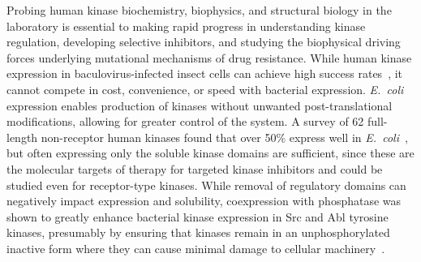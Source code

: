 \documentclass[phd,tocprelim]{cornell}
\begin{document}
Probing human kinase biochemistry, biophysics, and structural biology in the laboratory is essential to making rapid progress in understanding kinase regulation, developing selective inhibitors, and studying the biophysical driving forces underlying mutational mechanisms of drug resistance.
While human kinase expression in baculovirus-infected insect cells can achieve high success rates~\citep{vertex:2004:kinase-expression,wang:protein-express-pur:2008:high-yield-kinase-insect-cells}, it cannot compete in cost, convenience, or speed with bacterial expression. \emph{E.~coli} expression enables production of kinases without unwanted post-translational modifications, allowing for greater control of the system.  
A survey of 62 full-length non-receptor human kinases found that over 50\% express well in \emph{E.~coli}~\citep{vertex:2004:kinase-expression}, but often expressing only the soluble kinase domains are sufficient, since these are the molecular targets of therapy for targeted kinase inhibitors and could be studied even for receptor-type kinases. While removal of regulatory domains can negatively impact expression and solubility, coexpression with phosphatase was shown to greatly enhance bacterial kinase expression in Src and Abl tyrosine kinases, presumably by ensuring that kinases remain in an unphosphorylated inactive form where they can cause minimal damage to cellular machinery~\citep{seeliger:2005:protein-sci:kinase-expression}. 
\end{document}

